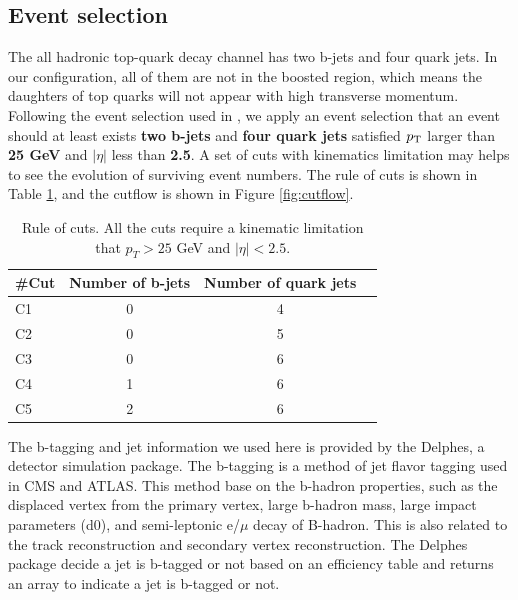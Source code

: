 \subsection{Event selection}\label{subsec:Event selection}
The all hadronic top-quark decay channel has two b-jets and four quark jets. In our configuration, all of them are not in the boosted region, which means the daughters of top quarks will not appear with high transverse momentum. Following the event selection used in \cite{Mccarthy:2015ucy},  we apply an event selection that an event should at least exists \textbf{two b-jets} and \textbf{four quark jets} satisfied $p_{\rm T}$ larger than \textbf{25 GeV} and $|\eta|$ less than \textbf{2.5}. A set of cuts with kinematics limitation may helps to see the evolution of surviving event numbers. The rule of cuts is shown in Table \ref{table:cuts}, and the cutflow is shown in Figure \ref{fig:cutflow}.
\\
\begin{center}
	\begin{table}[h]
		\begin{tabular}{p{} c c c }
			\cline{1-3}
			\#Cut    & Number of b-jets & Number of quark jets  \\
			\hline
			C1      &   0  & 4    \\
			C2      &   0  & 5    \\
			C3      &   0  & 6    \\
			C4      &   1  & 6    \\
			C5      &   2  & 6    \\
			\hline
		\end{tabular}
		\caption{Rule of cuts. All the cuts require a kinematic limitation that $p_{T} > 25$ GeV and $|\eta|<2.5$.}
		\label{table:cuts}
	\end{table}
\end{center}
The b-tagging and jet information we used here is provided by the Delphes, a detector simulation package\cite{deFavereau:2013fsa}. The b-tagging is a method of jet flavor tagging used in CMS and ATLAS\cite{ATLAS:2016gsw}\cite{Sirunyan:2017ezt}. This method base on the b-hadron properties, such as the displaced vertex from the primary vertex, large b-hadron mass, large impact parameters (d0), and semi-leptonic e/$\mu$ decay of B-hadron. This is also related to the track reconstruction and secondary vertex reconstruction. The Delphes package decide a jet is b-tagged or not based on an efficiency table and returns an array to indicate a jet is b-tagged or not.
\\
